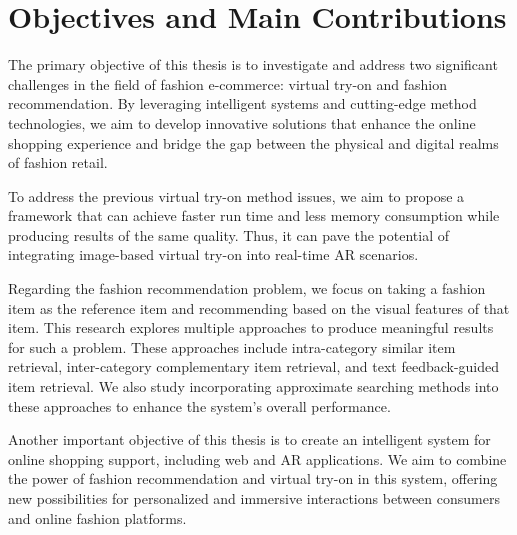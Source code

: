\section{Objectives and Main Contributions}
The primary objective of this thesis is to investigate and address two significant challenges in the field of fashion e-commerce: virtual try-on and fashion recommendation. By leveraging intelligent systems and cutting-edge method technologies, we aim to develop innovative solutions that enhance the online shopping experience and bridge the gap between the physical and digital realms of fashion retail.

To address the previous virtual try-on method issues, we aim to propose a framework that can achieve faster run time and less memory consumption while producing results of the same quality. Thus, it can pave the potential of integrating image-based virtual try-on into real-time AR scenarios.

Regarding the fashion recommendation problem, we focus on taking a fashion item as the reference item and recommending based on the visual features of that item. This research explores multiple approaches to produce meaningful results for such a problem. These approaches include intra-category similar item retrieval, inter-category complementary item retrieval, and text feedback-guided item retrieval. We also study incorporating approximate searching methods into these approaches to enhance the system's overall performance.

Another important objective of this thesis is to create an intelligent system for online shopping support, including web and AR applications. We aim to combine the power of fashion recommendation and virtual try-on in this system, offering new possibilities for personalized and immersive interactions between consumers and online fashion platforms.

